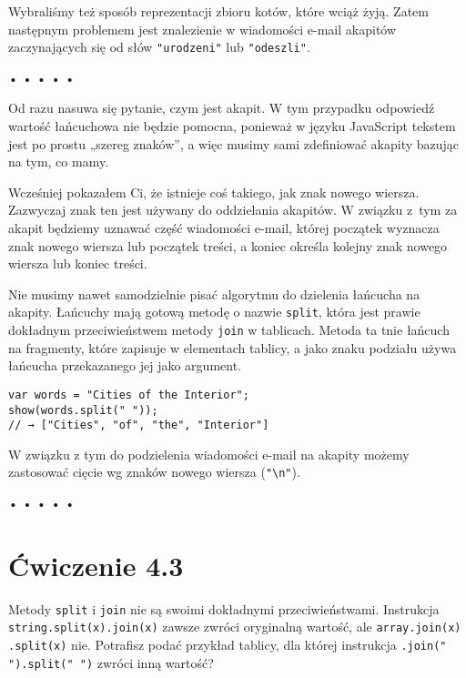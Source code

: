 Wybraliśmy też sposób reprezentacji zbioru kotów, które wciąż żyją. Zatem następnym problemem jest znalezienie w wiadomości e-mail akapitów zaczynających się od słów \texttt{"urodzeni"} lub \texttt{"odeszli"}.

  
  
\begin{center}
• • • • •
\end{center}
  
    
Od razu nasuwa się pytanie, czym jest akapit. W tym przypadku odpowiedź wartość łańcuchowa nie będzie pomocna, ponieważ w języku JavaScript tekstem jest po prostu „szereg znaków”, a więc musimy sami zdefiniować akapity bazując na tym, co mamy.

    
Wcześniej pokazałem Ci, że istnieje coś takiego, jak znak nowego wiersza. Zazwyczaj znak ten jest używany do oddzielania akapitów. W związku z~tym za akapit będziemy uznawać część wiadomości e-mail, której początek wyznacza znak nowego wiersza lub początek treści, a koniec określa kolejny znak nowego wiersza lub koniec treści.

    
Nie musimy nawet samodzielnie pisać algorytmu do dzielenia łańcucha na akapity. Łańcuchy mają gotową metodę o nazwie \texttt{split}, która jest prawie dokładnym przeciwieństwem metody \texttt{join} w tablicach. Metoda ta tnie łańcuch na fragmenty, które zapisuje w elementach tablicy, a jako znaku podziału używa łańcucha przekazanego jej jako argument.

    
\begin{verbatim} 
var words = "Cities of the Interior";
show(words.split(" "));
// → ["Cities", "of", "the", "Interior"]
\end{verbatim}
    
W związku z tym do podzielenia wiadomości e-mail na akapity możemy zastosować cięcie wg znaków nowego wiersza (\texttt{"\textbackslash n"}).

  
  
\begin{center}
• • • • •
\end{center}
  
    
\section*{Ćwiczenie 4.3}
\label{sec:4.3}
    
      
Metody \texttt{split} i \texttt{join} nie są swoimi dokładnymi przeciwieństwami. Instrukcja \texttt{string.split(x).join(x)} zawsze zwróci oryginalną wartość, ale \texttt{array.join(x)\\.split(x)} nie. Potrafisz podać przykład tablicy, dla której instrukcja \texttt{.join(" ").split(" ")} zwróci inną wartość?

